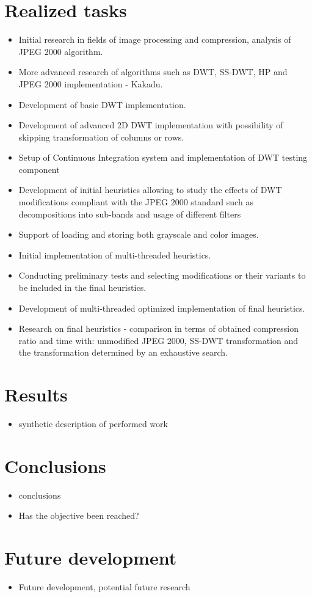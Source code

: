 \section{Realized tasks}

\begin{itemize}
    \item Initial research in fields of image processing and compression, analysis of JPEG 2000 algorithm. 
    \item More advanced research of algorithms such as DWT, SS-DWT, HP and JPEG 2000 implementation - Kakadu.
    \item Development of basic DWT implementation.
    \item Development of advanced 2D DWT implementation with possibility of skipping transformation of columns or rows.
    \item Setup of Continuous Integration system and implementation of DWT testing component 
    \item Development of initial heuristics allowing to study the effects of DWT modifications compliant
    with the JPEG 2000 standard such as decompositions into sub-bands and usage of different filters
    \item Support of loading and storing both grayscale and color images.
    \item Initial implementation of multi-threaded heuristics.
    \item Conducting preliminary tests and selecting modifications or their variants to be included in the final heuristics.
    \item Development of multi-threaded optimized implementation of final heuristics.
    \item Research on final heuristics - comparison in terms of obtained compression ratio and time with: unmodified JPEG 2000,
    SS-DWT transformation and the transformation determined by an exhaustive search.
\end{itemize}

\section{Results}

\begin{itemize}
    \item synthetic description of performed work
\end{itemize}


\section{Conclusions}

\begin{itemize}
    \item conclusions
    \item Has the objective been reached?
\end{itemize}


\section{Future development}

\begin{itemize}
    \item Future development, potential future research
\end{itemize}
